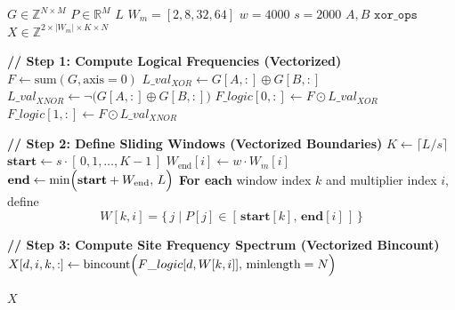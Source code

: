 \documentclass[9pt,twoside]{pnas-new}
\begin{document}
\begin{algorithm}[H]
\caption{ProcessGenotypeMatrixAndPositions (Vectorized)}\label{alg:vectorized}
\begin{algorithmic}[1]
\Require $G \in \mathbb{Z}^{N \times M}$ 
\Require $P \in \mathbb{R}^M$ 
\Require $L$ 
\Require $W_m = [2, 8, 32, 64]$ 
\Require $w = 4000$ 
\Require $s = 2000$ 
\Require $A, B$ 
\Require $\texttt{xor\_ops}$ 
\Ensure $X \in \mathbb{Z}^{2 \times |W_m| \times K \times N}$ 

\State \textbf{// Step 1: Compute Logical Frequencies (Vectorized)}
\State $F \gets \text{sum}(G,\text{axis}=0)$ 
\State $L\_val_{XOR} \gets G[A, :] \oplus G[B, :]$
\State $L\_val_{XNOR} \gets \neg\bigl(G[A, :] \oplus G[B, :]\bigr)$
\State $F\_logic[0, :] \gets F \odot L\_val_{XOR}$ 
\State $F\_logic[1, :] \gets F \odot L\_val_{XNOR}$ 
\smallskip

\State \textbf{// Step 2: Define Sliding Windows (Vectorized Boundaries)}
\State $K \gets \lceil L/s \rceil$
\State $\mathbf{start} \gets s \cdot [\,0,1,\ldots, K-1\,]$ 
    \State $W_{\text{end}}[i] \gets w \cdot W_m[i]$
\EndFor
\State $\mathbf{end} \gets \min\Bigl(\mathbf{start} + W_{\text{end}},\, L\Bigr)$ 
\State \textbf{For each} window index $k$ and multiplier index $i$, define
\[
W[k,i] = \{\, j \mid P[j] \in [\,\mathbf{start}[k],\, \mathbf{end}[i]\,] \,\}
\]

\State \textbf{// Step 3: Compute Site Frequency Spectrum (Vectorized Bincount)}
            \State $X[d,i,k,:] \gets \text{bincount}\Bigl(F\_logic[d, W[k,i]],\, \text{minlength}=N\Bigr)$
        \EndFor
    \EndFor
\EndFor
\smallskip

\State \Return $X$
\end{algorithmic}
\label{alg:alg1}
\end{algorithm}

\nopagebreak[4]
\end{document}
